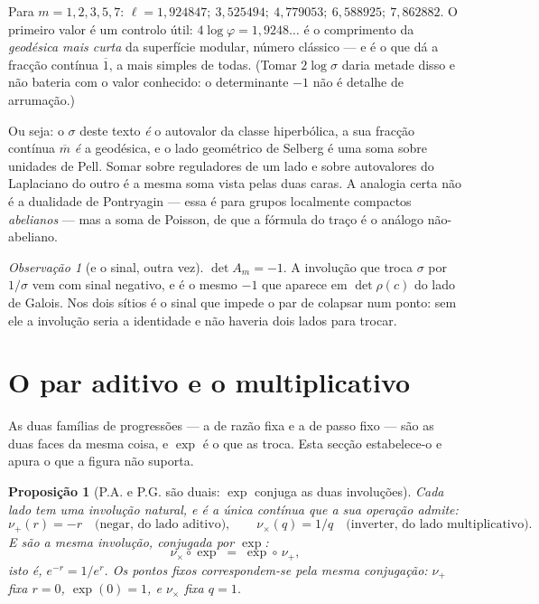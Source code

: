 \documentclass[11pt,a4paper]{article}
\theoremstyle{plain}
\newtheorem{proposicao}[teorema]{Proposição}
\theoremstyle{definition}
\theoremstyle{remark}
\newtheorem{obs}[teorema]{Observação}
\begin{document}
\noindent Para $m=1,2,3,5,7$: $\ell = 1{,}924847;\ 3{,}525494;\ 4{,}779053;\ 6{,}588925;\
7{,}862882$. O primeiro valor é um controlo útil: $4\log\varphi = 1{,}9248\ldots$ é o comprimento
da \emph{geodésica mais curta} da superfície modular, número clássico --- e é o que dá a fracção
contínua $\overline{1}$, a mais simples de todas. (Tomar $2\log\sigma$ daria metade disso e não
bateria com o valor conhecido: o determinante $-1$ não é detalhe de arrumação.)

Ou seja: o $\sigma$ deste texto \emph{é} o autovalor da classe hiperbólica, a sua fracção contínua
$\overline{m}$ \emph{é} a geodésica, e o lado geométrico de Selberg é uma soma sobre unidades de
Pell. Somar sobre reguladores de um lado e sobre autovalores do Laplaciano do outro é a mesma soma
vista pelas duas caras. A analogia certa não é a dualidade de Pontryagin --- essa é para grupos
localmente compactos \emph{abelianos} --- mas a soma de Poisson, de que a fórmula do traço é o
análogo não-abeliano.

\begin{obs}[e o sinal, outra vez]
$\det A_m = -1$. A involução que troca $\sigma$ por $1/\sigma$ vem com sinal negativo, e é o mesmo
$-1$ que aparece em $\det\rho(c)$ do lado de Galois. Nos dois sítios é o sinal que impede o par de
colapsar num ponto: sem ele a involução seria a identidade e não haveria dois lados para trocar.
\end{obs}


\section{O par aditivo e o multiplicativo}\label{sec:aditmult}

As duas famílias de progressões --- a de razão fixa e a de passo fixo --- são as duas faces
da mesma coisa, e $\exp$ é o que as troca. Esta secção estabelece-o e apura o que a figura
não suporta.

\begin{proposicao}[P.A. e P.G. são duais: $\exp$ conjuga as duas involuções]\label{prop:conjuga}
Cada lado tem uma involução natural, e é a única \emph{contínua} que a sua operação admite:
\[
  \nu_+(r) = -r \quad\text{(negar, do lado aditivo)}, \qquad
  \nu_\times(q) = 1/q \quad\text{(inverter, do lado multiplicativo)} .
\]
E são a \emph{mesma} involução, conjugada por $\exp$:
\[
  \nu_\times \circ \exp \;=\; \exp \circ\, \nu_+ ,
\]
isto é, $e^{-r} = 1/e^{r}$. Os pontos fixos correspondem-se pela mesma conjugação:
$\nu_+$ fixa $r=0$, $\exp(0)=1$, e $\nu_\times$ fixa $q=1$.
\end{proposicao}
\end{document}
